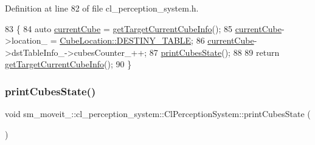 Definition at line 82 of file cl\+\_\+perception\+\_\+system.\+h.


\begin{DoxyCode}
83             \{
84                 \textcolor{keyword}{auto} \hyperlink{classsm__moveit__4_1_1cl__perception__system_1_1ClPerceptionSystem_ae2a80b803814af8b3c87f810f2728af0}{currentCube} = \hyperlink{classsm__moveit__4_1_1cl__perception__system_1_1ClPerceptionSystem_ac4b944cebb2055a85a33129665df5dcf}{getTargetCurrentCubeInfo}();
85                 \hyperlink{classsm__moveit__4_1_1cl__perception__system_1_1ClPerceptionSystem_ae2a80b803814af8b3c87f810f2728af0}{currentCube}->location\_ = \hyperlink{namespacesm__moveit__4_1_1cl__perception__system_a0d1b8834532a7cf9d19670791eece6d1acdc3fdda18904b4a1ac0be036c86f973}{CubeLocation::DESTINY\_TABLE};
86                 \hyperlink{classsm__moveit__4_1_1cl__perception__system_1_1ClPerceptionSystem_ae2a80b803814af8b3c87f810f2728af0}{currentCube}->dstTableInfo\_->cubesCounter\_++;
87                 \hyperlink{classsm__moveit__4_1_1cl__perception__system_1_1ClPerceptionSystem_a70ec0058531af470ab52268bd6540ddd}{printCubesState}();
88 
89                 \textcolor{keywordflow}{return} \hyperlink{classsm__moveit__4_1_1cl__perception__system_1_1ClPerceptionSystem_ac4b944cebb2055a85a33129665df5dcf}{getTargetCurrentCubeInfo}();
90             \}
\end{DoxyCode}
\mbox{\label{classsm__moveit__4_1_1cl__perception__system_1_1ClPerceptionSystem_a70ec0058531af470ab52268bd6540ddd}} 
\subsubsection{\texorpdfstring{print\+Cubes\+State()}{printCubesState()}}
{\footnotesize\ttfamily void sm\+\_\+moveit\+\_\+::cl\+\_\+perception\+\_\+system\+::\+Cl\+Perception\+System\+::print\+Cubes\+State (\begin{DoxyParamCaption}{ }\end{DoxyParamCaption})\hspace{0.3cm}{\ttfamily [inline]}}



